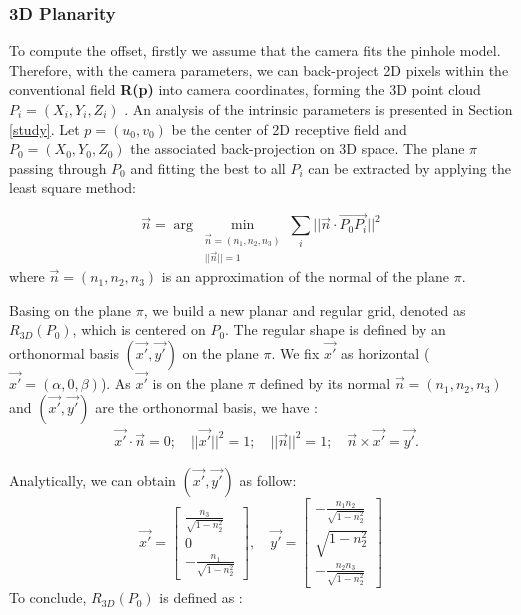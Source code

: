 \documentclass[lettersize,journal]{IEEEtran}
\begin{document}
\subsubsection{3D Planarity}


To compute the offset, firstly we assume that the camera fits the pinhole model. Therefore, with the camera parameters, we can back-project 2D pixels within the conventional field \textbf{R(p)} into camera coordinates, forming the 3D point cloud $P_i = (X_i, Y_i, Z_i)$ . An analysis of the intrinsic parameters is presented in Section \ref{study}. Let $p=(u_0, v_0)$ be the center of 2D receptive field and $P_0=(X_0, Y_0, Z_0)$ the associated back-projection on 3D space. The plane $\pi$ passing through $P_0$ and fitting the best to all $P_i$ can be extracted by applying the least square method:

\begin{equation}
\label{eq:plane}
\overrightarrow{n} = \arg\min_{\substack{    \overrightarrow{n}=(n_1,n_2,n_3)\\   ||\overrightarrow{n}||=1}} \sum_i || \overrightarrow{n} \cdot \overrightarrow{P_0 P_i}||^2
\end{equation}
where $\overrightarrow{n}=(n_1, n_2, n_3)$ is an approximation of the normal of the plane $\pi$.


Basing on the plane $\pi$, we build a new planar and regular grid, denoted as $R_{3D}(P_0)$, which is centered on $P_0$. The regular shape is defined by an orthonormal basis $(\Vec{x'}, \Vec{y'})$ on the plane $\pi$. We fix $\Vec{x'}$ as horizontal ($\Vec{x'} = (\alpha, 0, \beta)$). As $\Vec{x'}$ is on the plane $\pi$ defined by its normal $\Vec{n} = (n_1, n_2, n_3)$ and $(\Vec{x'}, \Vec{y'})$ are the orthonormal basis, we have : 
\begin{equation}
\begin{split}
    &\Vec{x'} \cdot \Vec{n} = 0; \quad ||\Vec{x'}||^2 = 1; \quad ||\Vec{n}||^2 = 1; \quad \Vec{n} \times \Vec{x'} = \Vec{y'}.
\end{split}
\end{equation}

Analytically, we can obtain $(\Vec{x'}, \Vec{y'})$ as follow:
\begin{equation}
\renewcommand\arraystretch{1.8}
\Vec{x'} = 
\begin{bmatrix}
\frac{n_3}{\sqrt{1 - n_2^2}} \\
0 \\
-\frac{n_1}{\sqrt{1 - n_2^2}}
\end{bmatrix},
\quad
\Vec{y'} = 
\begin{bmatrix}

-\frac{n_1n_2}{\sqrt{1 - n_2^2}} \\
\sqrt{1 - n_2^2}\\
-\frac{n_2n_3}{\sqrt{1 - n_2^2}}
\end{bmatrix}
\label{eq:basis}
\end{equation}
To conclude, $R_{3D}(P_0)$ is defined as : 
\end{document}
